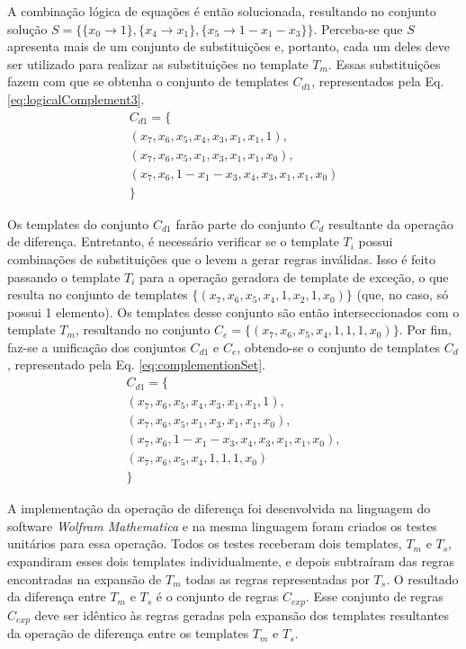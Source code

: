 A combinação lógica de equações é então solucionada, resultando no conjunto solução $S = \{\{x_0 \to 1\}, \{x_4 \to x_1\}, \{x_5 \to 1 - x_1 - x_3\}\}$. Perceba-se que $S$ apresenta mais de um conjunto de substituições e, portanto, cada um deles deve ser utilizado para realizar as substituições no template $T_m$. Essas substituições fazem com que se obtenha o conjunto de templates $C_{d1}$, representados pela Eq. \eqref{eq:logicalComplement3}. 
\begin{equation}
\begin{split}
C_{d1} = \{\\(x_7, x_6, x_5, x_4, x_3, x_1, x_1, 1), \\(x_7, x_6, x_5, x_1, x_3, x_1, x_1, x_0), \\(x_7, x_6, 1 - x_1 - x_3, x_4, x_3, x_1, x_1, x_0)\\\}
\end{split}
\label{eq:logicalComplement3}
\end{equation}

Os templates do conjunto $C_{d1}$ farão parte do conjunto $C_d$ resultante da operação de diferença. Entretanto, é necessário verificar se o template $T_i$ possui combinações de substituições que o levem a gerar regras inválidas. Isso é feito passando o template $T_i$ para a operação geradora de template de exceção, o que resulta no conjunto de templates $\{(x_7, x_6, x_5, x_4, 1, x_2, 1, x_0)\}$ (que, no caso, só possui 1 elemento). Os templates desse conjunto são então interseccionados com o template $T_m$, resultando no conjunto $C_e = \{(x_7, x_6, x_5, x_4, 1, 1, 1, x_0)\}$. Por fim, faz-se a unificação dos conjuntos $C_{d1}$ e $C_e$, obtendo-se o conjunto de templates $C_d$, representado pela Eq. \ref{eq:complementionSet}.
\begin{equation}
\begin{split}
C_{d1} = \{\\(x_7, x_6, x_5, x_4, x_3, x_1, x_1, 1), \\(x_7, x_6, x_5, x_1, x_3, x_1, x_1, x_0), \\(x_7, x_6, 1 - x_1 - x_3, x_4, x_3, x_1, x_1, x_0), \\(x_7, x_6, x_5, x_4, 1, 1, 1, x_0)\\\}
\label{eq:complementionSet}
\end{split}
\end{equation}

A implementação da operação de diferença foi desenvolvida na linguagem do software \textit{Wolfram Mathematica} \cite{woframMathematica10} e na mesma linguagem foram criados os testes unitários para essa operação. Todos os testes receberam dois templates, $T_m$ e $T_s$, expandiram esses dois templates individualmente, e depois subtraíram das regras encontradas na expansão de $T_m$ todas as regras representadas por $T_s$. O resultado da diferença entre $T_m$ e $T_s$ é o conjunto de regras $C_{exp}$. Esse conjunto de regras $C_{exp}$ deve ser idêntico às regras geradas pela expansão dos templates resultantes da operação de diferença entre os templates $T_m$ e $T_s$.


